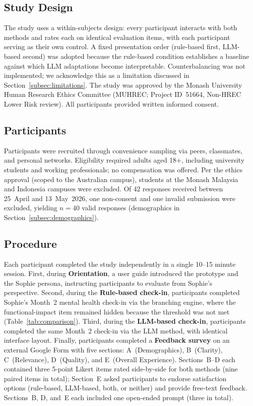 \documentclass[conference]{IEEEtran}
\begin{document}
\subsection{Study Design}
\label{subsec:research_design}
\label{sec:study}

The study uses a within-subjects design: every participant interacts
with both methods and rates each on identical evaluation items, with
each participant serving as their own control. A fixed presentation
order (rule-based first, LLM-based second) was adopted because the
rule-based condition establishes a baseline against which LLM
adaptations become interpretable. Counterbalancing was not implemented;
we acknowledge this as a limitation discussed in
Section~\ref{subsec:limitations}. The study was approved by the Monash
University Human Research Ethics Committee (MUHREC; Project ID~51664,
Non-HREC Lower Risk review). All participants provided written informed
consent.

\subsection{Participants}
\label{subsec:participants}

Participants were recruited through convenience sampling via peers,
classmates, and personal networks. Eligibility required adults aged
18+, including university students and working professionals; no
compensation was offered. Per the ethics approval (scoped to the
Australian campus), students at the Monash Malaysia and Indonesia
campuses were excluded. Of 42 responses received between 25~April and
13~May~2026, one non-consent and one invalid submission were excluded,
yielding $n=40$ valid responses (demographics in
Section~\ref{subsec:demographics}).

\subsection{Procedure}
\label{subsec:procedure}

Each participant completed the study independently in a single 10--15
minute session. First, during \textbf{Orientation}, a user guide introduced
the prototype and the Sophie persona, instructing participants to evaluate
from Sophie's perspective. Second, during the \textbf{Rule-based check-in},
participants completed Sophie's Month~2 mental health check-in via the
branching engine, where the functional-impact item remained hidden because
the threshold was not met (Table~\ref{tab:comparison}). Third, during the
\textbf{LLM-based check-in}, participants completed the same Month~2
check-in via the LLM method, with identical interface layout. Finally,
participants completed a \textbf{Feedback survey} on an external Google Form
with five sections: A~(Demographics), B~(Clarity), C~(Relevance),
D~(Quality), and E~(Overall Experience). Sections~B--D each contained
three 5-point Likert items rated side-by-side for both methods (nine
paired items in total); Section~E asked participants to endorse
satisfaction options (rule-based, LLM-based, both, or neither) and
provide free-text feedback. Sections~B, D, and~E each included one
open-ended prompt (three in total).
\end{document}
